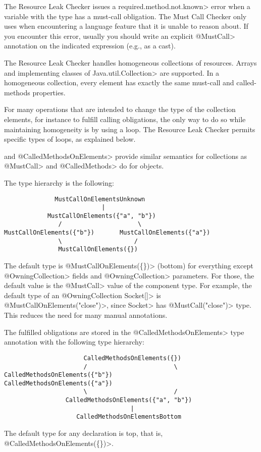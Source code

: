 The Resource Leak Checker issues a \<required.method.not.known> error
when a variable with the type \MustCallUnknown has a must-call obligation.
The Must Call Checker
only uses \MustCallUnknown when encountering a language
feature that it is unable to reason about.
If you encounter this error, usually you should write an explicit \<@MustCall> annotation
on the indicated expression (e.g., as a cast).

\pagebreak


The Resource Leak Checker handles homogeneous collections of resources. Arrays and implementing classes of \<Java.util.Collection> are supported. In a homogeneous collection, every element
has exactly the same must-call and called-methods properties.

For many operations that are intended to change the type of the collection elements, for instance to fulfill calling obligations, the only way to do so while maintaining
homogeneity is by using a loop.  The Resource Leak Checker permits
specific types of loops, as explained below.

\MustCallOnElements and \<@CalledMethodsOnElements> provide similar semantics for collections as \<@MustCall> and \<@CalledMethods> do for objects.

The type hierarchy is the following:

\begin{verbatim}
              MustCallOnElementsUnknown
                           |
            MustCallOnElements({"a", "b"})
               /                     \
MustCallOnElements({"b"})       MustCallOnElements({"a"})
               \                    /
               MustCallOnElements({})
\end{verbatim}

The default type is \<@MustCallOnElements(\{\})> (bottom) for everything except
\<@OwningCollection> fields and \<@OwningCollection> parameters. For those, the
default \MustCallOnElements value is the \<@MustCall> value of the component
type. For example, the default type of an \<@OwningCollection Socket[]> is
\<@MustCallOnElements({"close"})>, since \<Socket> has \<@MustCall("close")>
type. This reduces the need for many manual annotations.

The fulfilled obligations are stored in the \<@CalledMethodsOnElements> type annotation with the following type hierarchy:
\begin{verbatim}
                      CalledMethodsOnElements({})
                      /                        \
CalledMethodsOnElements({"b"})           CalledMethodsOnElements({"a"})
                      \                        /
                 CalledMethodsOnElements({"a", "b"})
                                   |
                    CalledMethodsOnElementsBottom
\end{verbatim}
The default type for any declaration is top, that is, \<@CalledMethodsOnElements(\{\})>.

